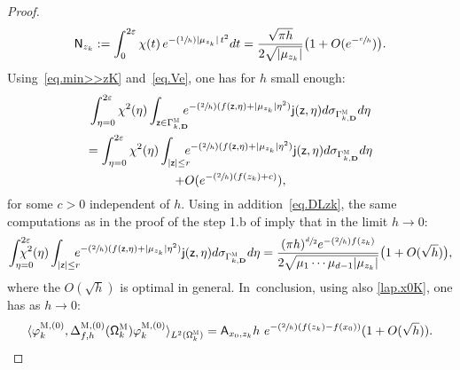 \documentclass[JEP,XML,SOM,Unicode,NoEqCountersInSection,NoFloatCountersInSection,published]{cedram}
\newcommand{\Psfrac}[2]{(\sfrac{#1}{#2})}
\newcommand{\mbf}[1]{\mathbf{#1}}
\let\ve\varepsilon
\theoremstyle{plain}
\theoremstyle{definition}
\begin{document}
\begin{proof}
\begin{align}
\mathsf N_{z_k}:=\int_0^{2\ve}\chi(t)\, e^{-\Psfrac 1h\vert \mu_{z_k}\vert \, t^2} dt=\frac{\sqrt{\pi h} }{2\sqrt{\vert \mu_{z_k}\vert}} \bigl(1+O(e^{-\sfrac ch})\bigr).
\end{align}
Using~\eqref{eq.min>>zK} and~\eqref{eq.Ve}, one has for $h$ small enough:\vspace*{-3pt}
\begin{multline*}
\int_{\eta=0}^{2\ve} \chi^2(\eta) \int_{\mathsf z \in \Gamma_{k,\mbf
D}^{\textsc{M}} } \!\! \!\! e^{-\Psfrac 2h
(f(\mathsf z,\eta) +\vert \mu_{z_k}\vert \eta^2)}
\mathsf j(\mathsf z,\eta)d\sigma
_{\Gamma^{\textsc{M}}_{k,\mbf D}} d\eta\\
= \int_{\eta=0}^{2\ve} \chi^2(\eta) \int_{|\mathsf z |\le r } \!\! \!\! e^{-\Psfrac 2h (f(\mathsf z,\eta) +\vert \mu_{z_k}\vert \eta^2)} \mathsf j(\mathsf z,\eta) d\sigma _{\Gamma^{\textsc{M}}_{k,\mbf D}} d\eta \\
+O(e^{-\Psfrac 2h (f(z_k)+c)}),
\end{multline*}
for some $c>0$ independent of $h$.
Using in addition~\eqref{eq.DLzk}, the same computations as in the proof of the step 1.b of \cite[Prop.\,24]{DoNe2} imply that in the limit $h\to 0$:\vspace*{-3pt}
\[
\int_{\eta=0}^{2\ve} \!\!\! \!\!\! \!\!\chi^2(\eta) \int_{|\mathsf z |\le r } \!\! \!\! e^{-\Psfrac 2h (f(\mathsf z,\eta) +\vert \mu_{z_k}\vert \eta^2)} \mathsf j(\mathsf z,\eta) d\sigma _{\Gamma^{\textsc{M}}_{k,\mbf D}} d\eta =\frac{ (\pi h)^{\sfrac{d}{2} } e^{-\Psfrac 2h f(z_k)}}{2\sqrt{\mu_1 \cdots \mu_{d-1} \vert \mu_{z_k}\vert}}
\bigl(1+ O (\sqrt h) \bigr),
\]
where the $O (\sqrt h)$ is optimal in general. In~conclusion, using also \eqref{lap.x0K}, one has as $h\to 0$:
\begin{equation}\label{eq.Ax0ps}
\langle \varphi^{\textsc{M},(0)}_k,\Delta_{f,h}^{\textsc{M}, (0)}(\mathsf \Omega_k^{\textsc{M}}) \varphi^{\textsc{M},(0)}_k \rangle_{L^2(\mathsf \Omega_k^{\textsc{M}})}= \mathsf A_{x_0,z_k}h \ e^{-\Psfrac 2h (f(z_k)-f(x_0))} (1+O(\sqrt h)).
\end{equation}


\end{proof}
\end{document}
